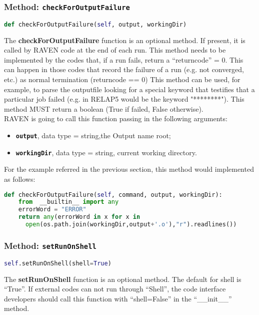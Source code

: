  \subsubsection{Method: \texttt{checkForOutputFailure}}
\label{subsubsec:checkForOutputFailure}
\begin{lstlisting}[language=python]
def checkForOutputFailure(self, output, workingDir)
\end{lstlisting}
The \textbf{checkForOutputFailure} function is an optional method. If present, it is called
by RAVEN code at the end of each run. This method needs to be implemented by the codes that, if a run fails, return a ``returncode'' = 0.
This can happen in those codes that record the failure of a run (e.g. not converged, etc.) as normal termination (returncode == 0)
This method can be used, for example, to parse the outputfile looking for a special keyword that testifies that a particular job  failed
 (e.g. in RELAP5 would be the keyword "********"). This method MUST return a boolean (True if failed, False otherwise).
\\RAVEN is going to call this function passing in the following arguments:
\begin{itemize}
  \item \textbf{\texttt{output}}, data type = string,the Output name root;
  \item  \textbf{\texttt{workingDir}}, data type = string, current working directory.
\end{itemize}
For the example referred in the previous section, this method would implemented as follows:
\newline
\begin{lstlisting}[language=python]
def checkForOutputFailure(self, command, output, workingDir):
    from  __builtin__ import any
    errorWord = "ERROR"
    return any(errorWord in x for x in
      open(os.path.join(workingDir,output+'.o'),"r").readlines())
 \end{lstlisting}

\subsubsection{Method: \texttt{setRunOnShell}}
\label{subsubsec:setRunOnShell}
\begin{lstlisting}[language=python]
self.setRunOnShell(shell=True)
\end{lstlisting}
The \textbf{setRunOnShell} function is an optional method. The default for shell is ``True''.
If external codes can not run through ``Shell'', the code interface developers should call this
function with ``shell=False'' in the ``\_\_init\_\_'' method.

